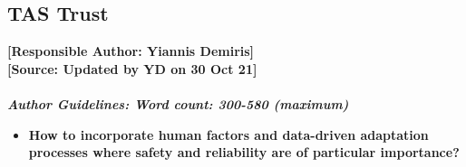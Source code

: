\documentclass[sigconf]{acmart}
\begin{document}
\subsection{TAS Trust}
\noindent\textbf{[Responsible Author:  Yiannis Demiris]}\\
\noindent\textbf{[Source: Updated by YD on 30 Oct 21]}\\\\
\noindent\textbf{\textit{Author Guidelines: Word count: 300-580 (maximum)}}\\
\begin{itemize}
	\item \textbf{How to incorporate human factors and data-driven adaptation processes where safety and reliability are of particular importance?}
\end{itemize}
\end{document}
